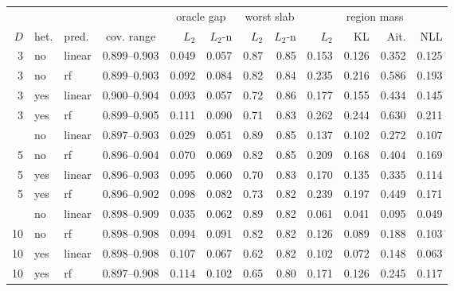 \begin{tabular}{rllcrrrrrrrr}
\toprule
 & & & & \multicolumn{2}{c}{oracle gap} & \multicolumn{2}{c}{worst slab} & \multicolumn{4}{c}{region mass} \\
\cmidrule(lr){5-6} \cmidrule(lr){7-8} \cmidrule(lr){9-12}
$D$ & het. & pred. & cov. range & $L_2$ & $L_2$-n & $L_2$ & $L_2$-n & $L_2$ & KL & Ait. & NLL \\
\midrule
3 & no & linear & 0.899--0.903 & 0.049 & 0.057 & 0.87 & 0.85 & 0.153 & 0.126 & 0.352 & 0.125 \\
3 & no & rf & 0.899--0.903 & 0.092 & 0.084 & 0.82 & 0.84 & 0.235 & 0.216 & 0.586 & 0.193 \\
3 & yes & linear & 0.900--0.904 & 0.093 & 0.057 & 0.72 & 0.86 & 0.177 & 0.155 & 0.434 & 0.145 \\
3 & yes & rf & 0.899--0.905 & 0.111 & 0.090 & 0.71 & 0.83 & 0.262 & 0.244 & 0.630 & 0.211 \\
\addlinespace
5 & no & linear & 0.897--0.903 & 0.029 & 0.051 & 0.89 & 0.85 & 0.137 & 0.102 & 0.272 & 0.107 \\
5 & no & rf & 0.896--0.904 & 0.070 & 0.069 & 0.82 & 0.85 & 0.209 & 0.168 & 0.404 & 0.169 \\
5 & yes & linear & 0.896--0.903 & 0.095 & 0.060 & 0.70 & 0.83 & 0.170 & 0.135 & 0.335 & 0.114 \\
5 & yes & rf & 0.896--0.902 & 0.098 & 0.082 & 0.73 & 0.82 & 0.239 & 0.197 & 0.449 & 0.171 \\
\addlinespace
10 & no & linear & 0.898--0.909 & 0.035 & 0.062 & 0.89 & 0.82 & 0.061 & 0.041 & 0.095 & 0.049 \\
10 & no & rf & 0.898--0.908 & 0.094 & 0.091 & 0.82 & 0.82 & 0.126 & 0.089 & 0.188 & 0.103 \\
10 & yes & linear & 0.898--0.908 & 0.107 & 0.067 & 0.62 & 0.82 & 0.102 & 0.072 & 0.148 & 0.063 \\
10 & yes & rf & 0.897--0.908 & 0.114 & 0.102 & 0.65 & 0.80 & 0.171 & 0.126 & 0.245 & 0.117 \\
\bottomrule
\end{tabular}
